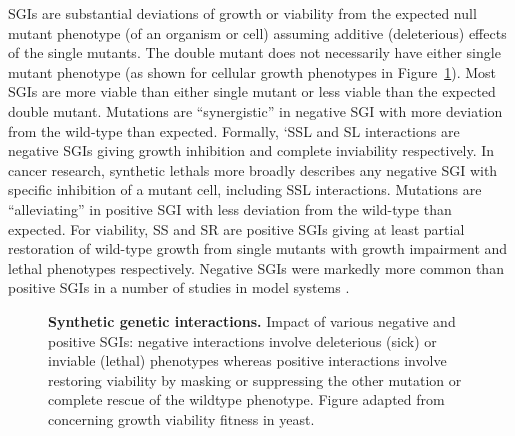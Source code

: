 
\glspl{SGI} are substantial deviations of growth or viability from the expected null \gls{mutant} phenotype (of an organism or cell) assuming additive (deleterious) effects of the single \glspl{mutant}. The double \gls{mutant} does not necessarily have either single \gls{mutant} phenotype (as shown for cellular growth phenotypes in Figure~\ref{fig:Costanzo2011}). Most \glspl{SGI} are more viable than either single \gls{mutant} or less viable than the expected double \gls{mutant}. Mutations are ``synergistic'' in negative \gls{SGI} with more deviation from the \gls{wild-type} than expected. Formally, `\gls{SSL} and \gls{SL} interactions are negative \glspl{SGI} giving growth inhibition and complete inviability respectively. In cancer research, \glspl{synthetic lethal} more broadly describes any negative \gls{SGI} with specific inhibition of a \gls{mutant} cell, including \gls{SSL} interactions. Mutations are ``alleviating'' in positive \gls{SGI} with less deviation from the \gls{wild-type} than expected. For viability, \gls{SS} and \gls{SR} are positive \glspl{SGI} giving at least partial restoration of \gls{wild-type} growth from single \glspl{mutant} with growth impairment and lethal phenotypes respectively. Negative \glspl{SGI} were markedly more common than positive \glspl{SGI} in a number of studies in model systems \citep{Tong2004, Boucher2013}. 

\begin{figure}[!ht]
   \caption[Synthetic genetic interactions]{\small \textbf{Synthetic genetic interactions.} Impact of various negative and positive \glspl{SGI}: negative interactions involve deleterious (sick) or inviable (lethal) phenotypes whereas positive interactions involve restoring viability by masking or suppressing the other \gls{mutation} or complete rescue of the wildtype phenotype. Figure adapted from \citep{Costanzo2011} concerning growth viability fitness in yeast.}
\label{fig:Costanzo2011}
\end{figure}

